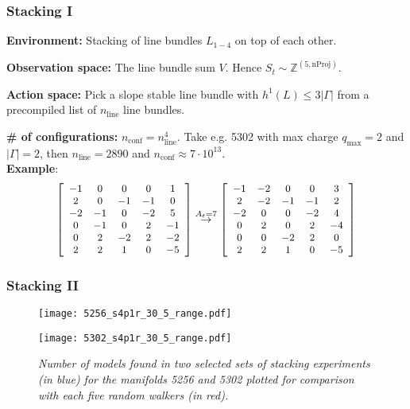 \documentclass{beamer}
\begin{document}
\begin{frame}
\frametitle{Stacking I}
\textbf{Environment:} Stacking of line bundles $L_{1-4}$ on top of each other.

\textbf{Observation space:} The line bundle sum $V$. Hence $S_t \sim \mathbb{Z}^{(5 , \text{nProj})}$. 

\textbf{Action space:} Pick a slope stable line bundle with $h^1(L) \leq 3 |\Gamma|$ from a precompiled list of $n_{\text{line}}$ line bundles.

\textbf{\# of configurations:} $n_{\text{conf}} = n_{\text{line}}^4$. Take e.g. 5302 with max charge $q_{\text{max}} = 2$ and $|\Gamma| = 2$, then $n_{\text{line}} = 2890$ and $n_{\text{conf}} \approx 7 \cdot 10^{13}$.\\

\textbf{Example}:
\begin{align}
\small
 \left[\begin{array}{ccccc}
-1& 0& 0& 0& 1\\ 
2& 0& -1& -1& 0\\ 
-2& -1& 0& -2& 5\\ 
0& -1& 0& 2& -1\\ 
0& 2& -2& 2& -2\\ 
2& 2& 1& 0& -5
	\end{array}\right] \stackrel{A_t = 7}{\rightarrow} \left[\begin{array}{ccccc}
-1& -2& 0& 0& 3\\ 
2& -2& -1& -1& 2\\ 
-2& 0& 0& -2& 4\\ 
0& 2& 0& 2& -4\\ 
0& 0& -2& 2& 0\\ 
2& 2& 1& 0& -5
	\end{array}\right]
\end{align}
\end{frame}

\begin{frame}
\frametitle{Stacking II}
\begin{figure}[t]
	
	\centering
	\begin{minipage}{0.47\linewidth}
		\texttt{[image: 5256\_s4p1r\_30\_5\_range.pdf]}
	\end{minipage}
	\begin{minipage}{0.47\linewidth}
		\texttt{[image: 5302\_s4p1r\_30\_5\_range.pdf]}
	\end{minipage}
	
	\caption{\it Number of models found in two selected sets of stacking experiments (in blue) for the manifolds 5256 and 5302 plotted for comparison with each five random walkers (in red).}
	\label{fig: stack}
\end{figure}
\end{frame}
\end{document}
